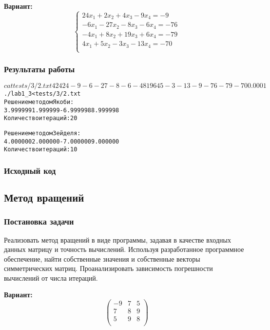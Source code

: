 {\bfseries Вариант:}
\begin{equation*}
\begin{cases}
24x_1 +2x_2 +4x_3 -9x_4 = -9\\
-6x_1 -27x_2 -8x_3 -6x_4 = -76\\
-4x_1 +8x_2 +19x_3 +6x_4 = -79\\
4x_1 +5x_2 -3x_3 -13x_4 = -70\\
\end{cases}
\end{equation*}

\subsubsection{Результаты работы}
\begin{alltt}
$ cat tests/3/2.txt
4
24 2 4 -9
-6 -27 -8 -6
-4 8 19 6
4 5 -3 -13
-9 -76 -79 -70
0.0001

$ ./lab1_3 < tests/3/2.txt
Решение методом Якоби:
3.999999 1.999999 -6.999998 8.999998
Количество итераций: 20

Решение методом Зейделя:
4.000000 2.000000 -7.000000 9.000000
Количество итераций: 10
\end{alltt}
\pagebreak

\subsubsection{Исходный код}

\pagebreak

\subsection{Метод вращений}

\subsubsection{Постановка задачи}
Реализовать метод вращений в виде программы, задавая в качестве входных данных матрицу и точность вычислений. Используя разработанное программное обеспечение, найти собственные значения и собственные векторы симметрических матриц. Проанализировать зависимость погрешности вычислений от числа итераций.

{\bfseries Вариант:}
\begin{equation*}
\begin{pmatrix}
-9& 7& 5\\
7& 8& 9\\
5& 9& 8\\
\end{pmatrix}
\end{equation*}

